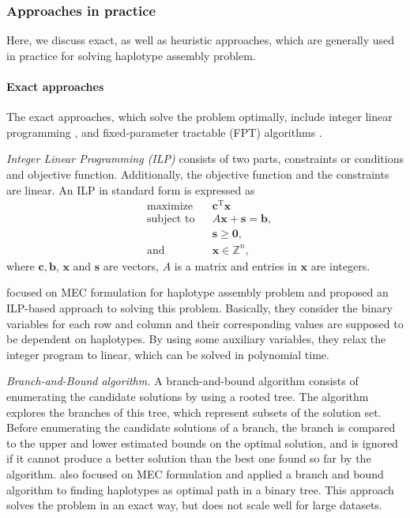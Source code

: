 \subsubsection{Approaches in practice}
Here, we discuss exact, as well as heuristic approaches, which are generally used in practice for solving haplotype assembly problem.
\paragraph{Exact approaches} The exact approaches, which solve the problem optimally, include integer linear programming \citep{Fouilhoux2012,CDW13_exact}, and fixed-parameter tractable (FPT) algorithms \citep{he2010optimal,Patterson2015,Pirola2015}.

\textit{Integer Linear Programming (ILP)} consists of two parts, constraints or conditions and objective function. Additionally, the objective function and the constraints are linear.
An ILP in standard form is expressed as
\[{\begin{aligned}&{\text{maximize}}&&\mathbf {c} ^{\mathrm {T} }\mathbf {x} \\&{\text{subject to}}&&A\mathbf {x} +\mathbf {s} =\mathbf {b} ,\\&&&\mathbf {s} \geq \mathbf {0} ,\\&{\text{and}}&&\mathbf {x} \in \mathbb {Z} ^{n},\end{aligned}}\]
where $\displaystyle \mathbf {c} ,\mathbf {b} $, $\mathbf {x}$ and $\mathbf {s}$ are vectors, $\displaystyle A $ is a matrix and entries in $\mathbf {x}$ are integers.

\cite{CDW13_exact} focused on MEC formulation for haplotype assembly problem and proposed an ILP-based approach to solving this problem.
Basically, they consider the binary variables for each row and column and their corresponding values are supposed to be dependent on haplotypes.
By using some auxiliary variables, they relax the integer program to linear, which can be solved in polynomial time.

\textit{Branch-and-Bound algorithm.}
A branch-and-bound algorithm consists of enumerating the candidate solutions by using a rooted tree.
The algorithm explores the branches of this tree, which represent subsets of the solution set.
Before enumerating the candidate solutions of a branch, the branch is compared to the upper and lower estimated bounds on the optimal solution, and is ignored if it cannot produce a better solution than the best one found so far by the algorithm.
\cite{wang2005haplotype} also focused on MEC formulation and applied a branch
and bound algorithm to finding haplotypes as optimal path in a binary tree. This approach solves the problem in an exact way, but does not scale well for large datasets.

